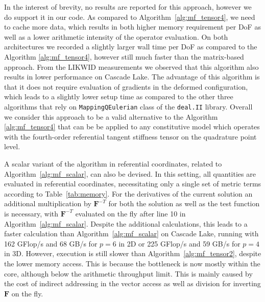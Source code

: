 \documentclass[AMA,STIX1COL]{WileyNJD-v2}
\newcommand*{\gz}[1]{\boldsymbol{#1}}
\begin{document}
{\color{red}
In the interest of brevity, no results are reported for this approach,
however we do support it in our code.
As compared to Algorithm~\ref{alg:mf_tensor4}, we need to cache more data, which results in both higher memory requirement per DoF as well as a lower arithmetic intensity of the operator evaluation.
On both architectures we recorded a slightly larger wall time per DoF as compared to the Algorithm \ref{alg:mf_tensor4}, however still much faster than the matrix-based approach.
From the LIKWID measurements we observed that this algorithm also results in lower performance on Cascade Lake.
The advantage of this algorithm is that it does not require evaluation of gradients in the deformed configuration, which leads to a slightly lower setup time as compared to the other three algorithms that rely on \texttt{MappingQEulerian} class of the \texttt{deal.II} library.
Overall we consider this approach to be a valid alternative to the Algorithm \ref{alg:mf_tensor4}
that can be be applied to any constitutive model which operates with the fourth-order referential tangent stiffness tensor on the quadrature point level.

A scalar variant of the algorithm in referential coordinates, related to Algorithm~\ref{alg:mf_scalar}, can also be devised. In this setting, all quantities are evaluated in referential coordinates, necessitating only a single set of metric terms according to Table~\ref{tab:memory}. For the derivatives of the current solution an additional multiplication by $\gz F^{-T}$ for both the solution as well as the test function is necessary, with $\gz F^{-T}$ evaluated on the fly after line 10 in Algorithm~\ref{alg:mf_scalar}. Despite the additional calculations, this leads to a faster calculation than Algorithm~\ref{alg:mf_scalar} on Cascade Lake, running with 162 GFlop/s and 68 GB/s for $p=6$ in 2D or 225 GFlop/s and 59 GB/s for $p=4$ in 3D. However, execution is still slower than Algorithm~\ref{alg:mf_tensor2}, despite the lower memory access. This is because the bottleneck is now mostly within the core, although below the arithmetic throughput limit. This is mainly caused by the cost of indirect addressing in the vector access as well as division for inverting $\gz F$ on the fly.
}

\ifijnme
%
\else

\fi


%
\end{document}
